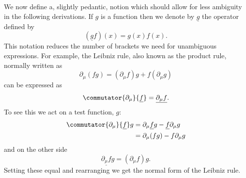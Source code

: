 \documentclass[fleqn]{NotesClass}
\newcommand{\multiplicative}[1]{\underline{#1}}
\begin{document}
    We now define a, slightly pedantic, notion which should allow for less ambiguity in the following derivations.
    If \(g\) is a function then we denote by \(\multiplicative{g}\) the operator defined by
    \begin{equation}
        (\multiplicative{g}f)(x) = g(x)f(x).
    \end{equation}
    This notation reduces the number of brackets we need for unambiguous expressions.
    For example, the Leibniz rule, also known as the product rule, normally written as
    \begin{equation}
        \partial_\mu(fg) = (\partial_\mu f)g + f(\partial_\mu g)
    \end{equation}
    can be expressed as
    \begin{equation}
        \commutator{\partial_\mu}{\multiplicative{f}} = \multiplicative{\partial_\mu f}.
    \end{equation}
    To see this we act on a test function, \(g\):
    \begin{align}
        \commutator{\partial_\mu}{\multiplicative{f}}g &= \partial_\mu \multiplicative{f} g - \multiplicative{f} \partial_\mu g\\
        &= \partial_\mu(fg) - f\partial_\mu g
    \end{align}
    and on the other side
    \begin{equation}
        \multiplicative{\partial_\mu f}g = (\partial_\mu f)g.
    \end{equation}
    Setting these equal and rearranging we get the normal form of the Leibniz rule.
    
\end{document}

